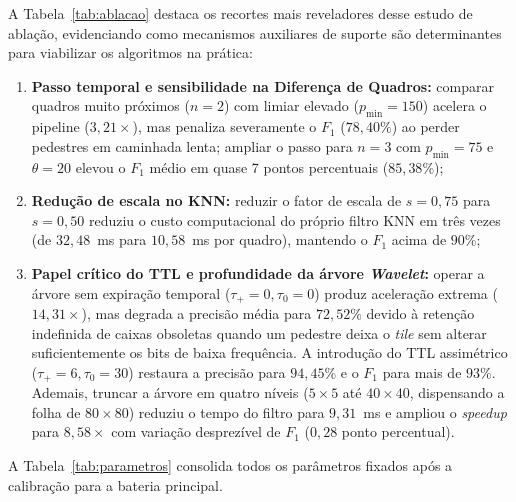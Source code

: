 \documentclass{ieeeaccess}
\begin{document}
A Tabela~\ref{tab:ablacao} destaca os recortes mais reveladores desse estudo de ablação, evidenciando como mecanismos auxiliares de suporte são determinantes para viabilizar os algoritmos na prática:
\begin{enumerate}
    \item \textbf{Passo temporal e sensibilidade na Diferença de Quadros:} comparar quadros muito próximos ($n=2$) com limiar elevado ($p_{\min}=150$) acelera o pipeline ($3{,}21\times$), mas penaliza severamente o $F_1$ ($78{,}40\%$) ao perder pedestres em caminhada lenta; ampliar o passo para $n=3$ com $p_{\min}=75$ e $\theta=20$ elevou o $F_1$ médio em quase 7 pontos percentuais ($85{,}38\%$);
    \item \textbf{Redução de escala no KNN:} reduzir o fator de escala de $s=0{,}75$ para $s=0{,}50$ reduziu o custo computacional do próprio filtro KNN em três vezes (de $32{,}48$~ms para $10{,}58$~ms por quadro), mantendo o $F_1$ acima de $90\%$;
    \item \textbf{Papel crítico do TTL e profundidade da árvore \textit{Wavelet}:} operar a árvore sem expiração temporal ($\tau_{+}=0, \tau_{0}=0$) produz aceleração extrema ($14{,}31\times$), mas degrada a precisão média para $72{,}52\%$ devido à retenção indefinida de caixas obsoletas quando um pedestre deixa o \textit{tile} sem alterar suficientemente os bits de baixa frequência. A introdução do TTL assimétrico ($\tau_{+}=6, \tau_{0}=30$) restaura a precisão para $94{,}45\%$ e o $F_1$ para mais de $93\%$. Ademais, truncar a árvore em quatro níveis ($5\times5$ até $40\times40$, dispensando a folha de $80\times80$) reduziu o tempo do filtro para $9{,}31$~ms e ampliou o \textit{speedup} para $8{,}58\times$ com variação desprezível de $F_1$ ($0{,}28$ ponto percentual).
\end{enumerate}

A Tabela~\ref{tab:parametros} consolida todos os parâmetros fixados após a calibração para a bateria principal.
\end{document}
